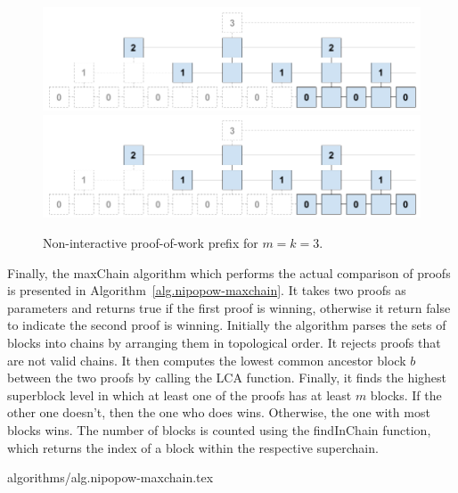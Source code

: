 \begin{figure}[h]
    \caption{Non-interactive proof-of-work prefix for $m=k = 3$.}
    \centering
    \iftwocolumn
        \includegraphics[width=\columnwidth,keepaspectratio]{figures/non-interactive-popow.png}
    \else
        \includegraphics[width=0.7\columnwidth,keepaspectratio]{figures/non-interactive-popow.png}
    \fi
    \label{fig.nipopow}
\end{figure}

Finally, the maxChain algorithm which performs the actual comparison of proofs
is presented in Algorithm~\ref{alg.nipopow-maxchain}. It takes two proofs as
parameters and returns true if the first proof is winning, otherwise it return
false to indicate the second proof is winning. Initially the algorithm parses
the sets of blocks into chains by arranging them in topological order. It
rejects proofs that are not valid chains. It then computes the lowest common
ancestor block $b$ between the two proofs by calling the LCA function. Finally,
it finds the highest superblock level in which at least one of the proofs has
at least $m$ blocks. If the other one doesn't, then the one who does wins.
Otherwise, the one with most blocks wins. The number of blocks is counted using
the findInChain function, which returns the index of a block within the
respective superchain.

{algorithms/alg.nipopow-maxchain.tex}
